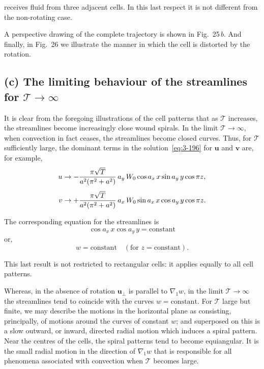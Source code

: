 \noindent receives fluid from three adjacent cells. In this last respect it is not different from the non-rotating case.

A perspective drawing of the complete trajectory is shown in Fig.~25\,$b$. And finally, in Fig.~26 we illustrate the manner in which the cell is distorted by the rotation.


\subsection*{(c) The limiting behaviour of the streamlines for $\mathscr{T}\to\infty$}

It is clear from the foregoing illustrations of the cell patterns that as $\mathscr{T}$ increases, the streamlines become increasingly close wound spirals. In the limit $\mathscr{T}\to\infty$, when convection in fact ceases, the streamlines become closed curves. Thus, for $\mathscr{T}$ sufficiently large, the dominant terms in the solution~\eqref{eq:3-196} for $\mathbf{u}$ and $\mathbf{v}$ are, for example,
\begin{align}
\mathbf{u} &\to -\frac{\pi\sqrt{\mathscr{T}}}{a^2(\pi^2+a^2)}\,a_y\,W_0\cos a_x\, x\sin a_y\, y\cos\pi z, \notag\\[4pt]
\mathbf{v} &\to +\frac{\pi\sqrt{\mathscr{T}}}{a^2(\pi^2+a^2)}\,a_x\,W_0\sin a_x\, x\cos a_y\, y\cos\pi z. \label{eq:3-208}
\end{align}

The corresponding equation for the streamlines is
\begin{equation}\label{eq:3-209}
\cos a_x\, x\cos a_y\, y = \text{constant}
\end{equation}
or,
\begin{equation}\label{eq:3-210}
w = \text{constant} \quad (\text{for } z = \text{constant}).
\end{equation}

This last result is not restricted to rectangular cells: it applies equally to all cell patterns.

Whereas, in the absence of rotation $\mathbf{u}_\perp$ is parallel to $\nabla_1 w$, in the limit $\mathscr{T}\to\infty$ the streamlines tend to coincide with the curves $w = \text{constant}$. For $\mathscr{T}$ large but finite, we may describe the motions in the horizontal plane as consisting, principally, of motions around the curves of constant $w$; and superposed on this is a slow outward, or inward, directed radial motion which induces a spiral pattern. Near the centres of the cells, the spiral patterns tend to become equiangular. It is the small radial motion in the direction of $\nabla_1 w$ that is responsible for all phenomena associated with convection when $\mathscr{T}$ becomes large.

